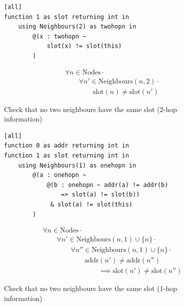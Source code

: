 \begin{figure}[H]
\begin{minipage}{.5\linewidth}
\begin{lstlisting}
[all]
function 1 as slot returning int in
    using Neighbours(2) as twohopn in
        @(x : twohopn ~
            slot(x) != slot(this)
        )
\end{lstlisting}
\end{minipage}%
\begin{minipage}{.5\linewidth}
\begin{align*}
&				\forall n \in \text{Nodes} \cdot \\
& \hspace{2em}		\forall n' \in \text{Neighbours}(n, 2) \cdot \\
& \hspace{4em}				\text{slot}(n) \neq \text{slot}(n')
\end{align*}
\end{minipage}

\caption{Check that no two neighbours have the same slot (2-hop information)}
\label{fig:two-hop-slot-pred-lang}
\end{figure}

\begin{figure}[H]
\begin{minipage}{.5\linewidth}
\begin{lstlisting}
[all]
function 0 as addr returning int in
function 1 as slot returning int in
    using Neighbours(1) as onehopn in
        @(a : onehopn ~
            @(b : onehopn ~ addr(a) != addr(b)
                => slot(a) != slot(b))
             & slot(a) != slot(this)
        )
\end{lstlisting}
\end{minipage}%
\begin{minipage}{.5\linewidth}
\begin{align*}
&				\forall n \in \text{Nodes} \cdot \\
& \hspace{2em}		\forall n' \in \text{Neighbours}(n, 1) \cup \{n\} \cdot \\
& \hspace{4em}			\forall n'' \in \text{Neighbours}(n, 1) \cup \{n\} \cdot \\
& \hspace{6em}				\text{addr}(n') \not= \text{addr}(n'') \\
& \hspace{8em}					\implies \text{slot}(n') \neq \text{slot}(n'')
\end{align*}
\end{minipage}
\caption{Check that no two neighbours have the same slot (1-hop information)}
\label{fig:one-hop-slot-pred-lang}
\end{figure}


